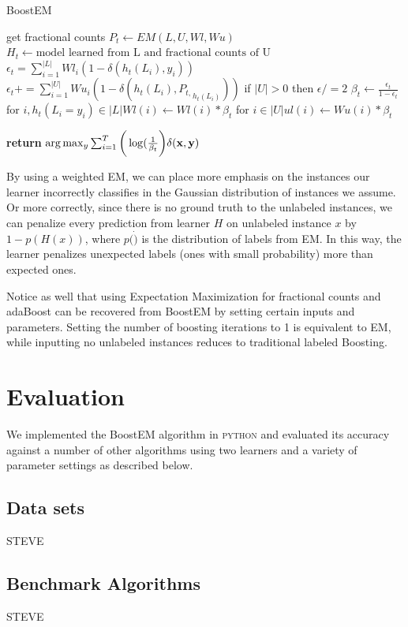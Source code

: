 \documentclass{sig-alternate}
\begin{document}
\begin{algorithm}
\caption{BoostEM}\label{euclid}
\begin{algorithmic}[1]
\State get fractional counts $P_{t} \gets EM(L,U,Wl,Wu)$
\State $H_{t} \gets \text{model learned from L and fractional counts of U}$
\State $\epsilon_{t} = \sum_{i=1}^{|L|} Wl_{i}(1-\delta(h_{t}(L_{i}),y_{i}))$
\State $\epsilon_{t} += \sum_{i=1}^{|U|} Wu_{i}(1-\delta(h_{t}(L_{i}),{P_{t,}}_{h_{t}(L_{i})}))$
\State if $|U| > 0$ then $\epsilon /=2$
\State $\beta_{t} \gets \frac{\epsilon_{t}}{1-\epsilon_{t}}$
\State for $i,h_{t}(L_{i} = y_{i}) \in |L| Wl(i) \gets Wl(i)*\beta_{t}$
\State for $i \in |U| ul(i) \gets Wu(i)*\beta_{t}$

\EndFor
\State \textbf{return} $\arg \max_{y} \sum_{i=1}^{T}\bigg(\log(\frac{1}{\beta_{t}}\bigg) \delta(\bf{x},y)$
\EndProcedure
\end{algorithmic}
\end{algorithm}

By using a weighted EM, we can place more emphasis on the instances our learner incorrectly classifies in the Gaussian distribution of instances we assume. Or more correctly, since there is no ground truth to the unlabeled instances, we can penalize every prediction from learner $H$ on unlabeled instance $x$ by $1-p(H(x))$, where $p(\dot)$ is the distribution of labels from EM.  In this way, the learner penalizes unexpected labels (ones with small probability) more than expected ones.

Notice as well that using Expectation Maximization for fractional counts and adaBoost can be recovered from BoostEM by setting certain inputs and parameters.  Setting the number of boosting iterations to 1 is equivalent to EM, while inputting no unlabeled instances reduces to traditional labeled Boosting.    
    
\section{Evaluation}
We implemented the BoostEM algorithm in \textsc{python} and evaluated its accuracy against a number of other algorithms using two learners and a variety of parameter settings  as described below.

\subsection{Data sets}
STEVE

\subsection{Benchmark Algorithms}
STEVE
\end{document}
